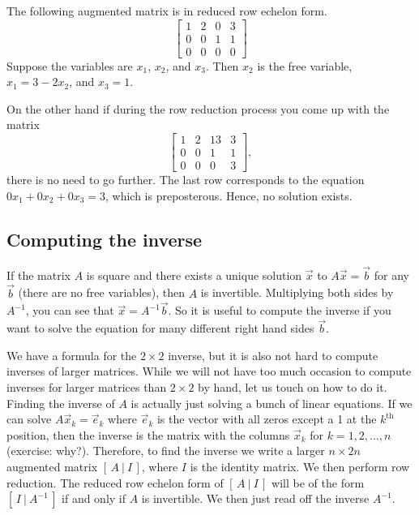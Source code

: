 \begin{example}
The following augmented matrix is in reduced row echelon form.
\begin{equation*}
\left[
\begin{array}{ccc|c}
1 & 2 & 0 & 3 \\
0 & 0 & 1 & 1 \\
0 & 0 & 0 & 0
\end{array}
\right]
\end{equation*}
Suppose
the variables are $x_1$, $x_2$, and $x_3$.  Then $x_2$ is the
free variable, $x_1 = 3 - 2x_2$, and $x_3 = 1$.

\medskip

On the other hand if during the row reduction process you come up with the
matrix
\begin{equation*}
\left[
\begin{array}{ccc|c}
1 & 2 & 13 & 3 \\
0 & 0 & 1 & 1 \\
0 & 0 & 0 & 3
\end{array}
\right]
,
\end{equation*}
there is no need to go further.  The last row corresponds to
the equation $0 x_1 + 0 x_2 + 0 x_3 = 3$, which is preposterous.  Hence, no
solution exists.
\end{example}

\subsection{Computing the inverse}

If the matrix $A$ is square and there exists a unique solution
$\vec{x}$ to $A \vec{x} = \vec{b}$ for any $\vec{b}$ (there are no free
variables), then $A$ is invertible.
Multiplying both sides by $A^{-1}$, you can see that $\vec{x} =
A^{-1} \vec{b}$.  So it is useful to compute the inverse if you want to
solve the equation for many different right hand sides $\vec{b}$.

We have a formula for
the $2 \times 2$ inverse, but it is also not hard
to compute inverses of larger matrices.
While we will not have too much occasion to compute inverses for larger
matrices than $2 \times 2$ by hand, let us touch on how to do it.
Finding the inverse of $A$ is actually just solving a bunch of linear
equations.  If we can solve $A \vec{x}_k = \vec{e}_k$ where $\vec{e}_k$ is
the vector with all zeros except a 1 at the $k^{\text{th}}$ position, then
the inverse is the matrix with the columns $\vec{x}_k$ for $k=1,2,\ldots,n$
(exercise: why?).  Therefore, to find the inverse we write a larger $n
\times 2n$ augmented matrix $[ \,A ~|~ I\, ]$, where $I$ is the identity
matrix.
We then perform row reduction.
The reduced row echelon form of $[ \,A ~|~ I\, ]$ 
will be of the form $[ \,I ~|~ A^{-1}\, ]$ if and only if
$A$ is invertible.  We then just read off the inverse $A^{-1}$.

